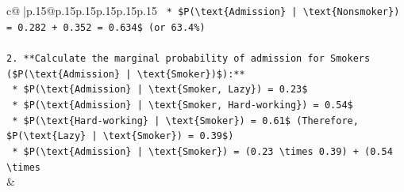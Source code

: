 \documentclass{article}
\begin{document}
{\begin{supertabular}{c@{$\;$}|p{.15\linewidth}@{}p{.15\linewidth}p{.15\linewidth}p{.15\linewidth}p{.15\linewidth}p{.15\linewidth}}
{{{\texttt{    *   \$P(\textbackslash{}text\{Admission\} | \textbackslash{}text\{Nonsmoker\}) = 0.282 + 0.352 = 0.634\$ (or 63.4\%)} \\
\\ 
\texttt{2.  **Calculate the marginal probability of admission for Smokers (\$P(\textbackslash{}text\{Admission\} | \textbackslash{}text\{Smoker\})\$):**} \\
\texttt{    *   \$P(\textbackslash{}text\{Admission\} | \textbackslash{}text\{Smoker, Lazy\}) = 0.23\$} \\
\texttt{    *   \$P(\textbackslash{}text\{Admission\} | \textbackslash{}text\{Smoker, Hard{-}working\}) = 0.54\$} \\
\texttt{    *   \$P(\textbackslash{}text\{Hard{-}working\} | \textbackslash{}text\{Smoker\}) = 0.61\$ (Therefore, \$P(\textbackslash{}text\{Lazy\} | \textbackslash{}text\{Smoker\}) = 0.39\$)} \\
\texttt{    *   \$P(\textbackslash{}text\{Admission\} | \textbackslash{}text\{Smoker\}) = (0.23 \textbackslash{}times 0.39) + (0.54 \textbackslash{}times} \\
            }
        }
    }
    & \\ \\


\end{supertabular}}
\end{document}
